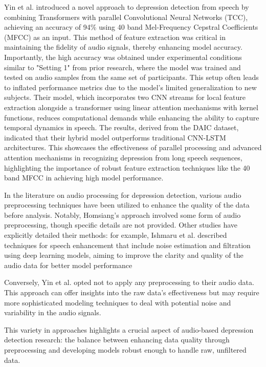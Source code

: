 Yin et al. \cite{yin2023depression} introduced a novel approach to depression detection from speech by combining Transformers with parallel Convolutional Neural Networks (TCC), achieving an accuracy of 94\% using 40 band Mel-Frequency Cepstral Coefficients (MFCC) \cite{wiki:mel_frequency_cepstrum} as an input. This method of feature extraction was critical in maintaining the fidelity of audio signals, thereby enhancing model accuracy. Importantly, the high accuracy was obtained under experimental conditions similar to "Setting 1" from prior research, where the model was trained and tested on audio samples from the same set of participants. This setup often leads to inflated performance metrics due to the model's limited generalization to new subjects. Their model, which incorporates two CNN streams for local feature extraction alongside a transformer using linear attention mechanisms with kernel functions, reduces computational demands while enhancing the ability to capture temporal dynamics in speech. The results, derived from the DAIC dataset, indicated that their hybrid model outperforms traditional CNN-LSTM architectures. This showcases the effectiveness of parallel processing and advanced attention mechanisms in recognizing depression from long speech sequences, highlighting the importance of robust feature extraction techniques like the 40 band MFCC in achieving high model performance.

In the literature on audio processing for depression detection, various audio preprocessing techniques have been utilized to enhance the quality of the data before analysis. Notably, Homsiang's approach involved some form of audio preprocessing, though specific details are not provided. Other studies have explicitly detailed their methods: for example, Ishmaru et al. described techniques for speech enhancement that include noise estimation and filtration using deep learning models, aiming to improve the clarity and quality of the audio data for better model performance \cite{kantamaneni2023speech}

Conversely, Yin et al. opted not to apply any preprocessing to their audio data. This approach can offer insights into the raw data's effectiveness but may require more sophisticated modeling techniques to deal with potential noise and variability in the audio signals.

This variety in approaches highlights a crucial aspect of audio-based depression detection research: the balance between enhancing data quality through preprocessing and developing models robust enough to handle raw, unfiltered data.